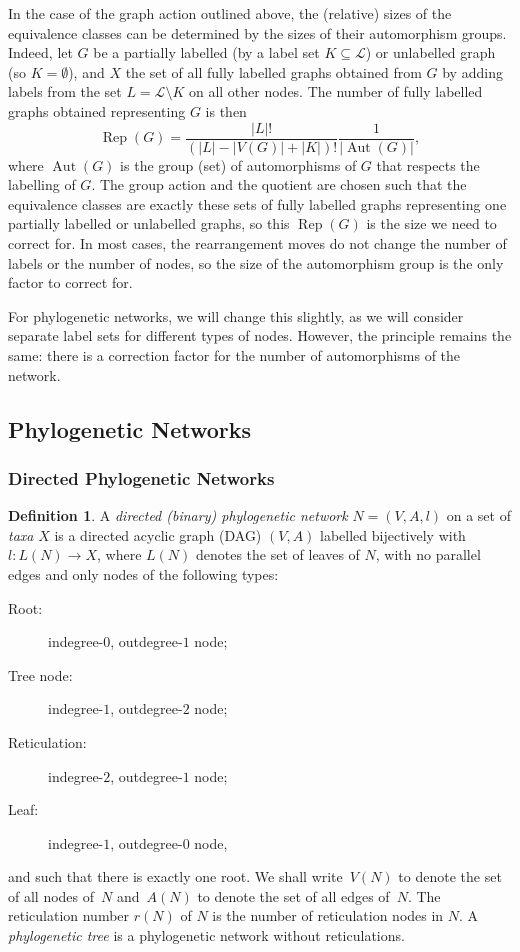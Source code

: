 \documentclass{article}
\theoremstyle{definition}
\newtheorem{definition}{Definition}
\DeclareMathOperator{\Aut}{Aut}
\DeclareMathOperator{\Rep}{Rep}
\begin{document}
In the case of the graph action outlined above, the (relative) sizes of the equivalence classes can be determined by the sizes of their automorphism groups. Indeed, let $G$ be a partially labelled (by a label set $K\subseteq \mathcal{L}$) or unlabelled graph (so $K=\emptyset$), and $X$ the set of all fully labelled graphs obtained from $G$ by adding labels from the set $L=\mathcal{L}\setminus K$ on all other nodes. The number of fully labelled graphs obtained representing $G$ is then 
\begin{equation}\label{eq:correction_representation}
    \Rep(G) = \frac{|L|!}{(|L|-|V(G)|+|K|)!} \frac{1}{|\Aut(G)|},
\end{equation} 
where $\Aut(G)$ is the group (set) of automorphisms of $G$ that respects the labelling of $G$. The group action and the quotient are chosen such that the equivalence classes are exactly these sets of fully labelled graphs representing one partially labelled or unlabelled graphs, so this $\Rep(G)$ is the size we need to correct for. In most cases, the rearrangement moves do not change the number of labels or the number of nodes, so the size of the automorphism group is the only factor to correct for.

For phylogenetic networks, we will change this slightly, as we will consider separate label sets for different types of nodes. However, the principle remains the same: there is a correction factor for the number of automorphisms of the network. 

\subsection{Phylogenetic Networks}
\subsubsection{Directed Phylogenetic Networks}
\begin{definition}
A \emph{directed (binary) phylogenetic network} $N=(V,A,l)$ on a set of \emph{taxa} $X$ is a directed acyclic graph (DAG) $(V,A)$ labelled bijectively with $l:L(N)\rightarrow X$, where $L(N)$ denotes the set of leaves of $N$, with no parallel edges and only nodes of the following types:
\begin{description}
    \item[Root:] indegree-$0$, outdegree-$1$ node;
    \item[Tree node:] indegree-$1$, outdegree-$2$ node;
    \item[Reticulation:] indegree-$2$, outdegree-$1$ node;
    \item[Leaf:] indegree-$1$, outdegree-$0$ node,
\end{description}
and such that there is exactly one root.
We shall write~$V(N)$ to denote the set of all nodes of~$N$ and~$A(N)$ to denote the set of all edges of~$N$.
The reticulation number $r(N)$ of $N$ is the number of reticulation nodes in $N$. A \emph{phylogenetic tree} is a phylogenetic network without reticulations.
\end{definition}
\end{document}
